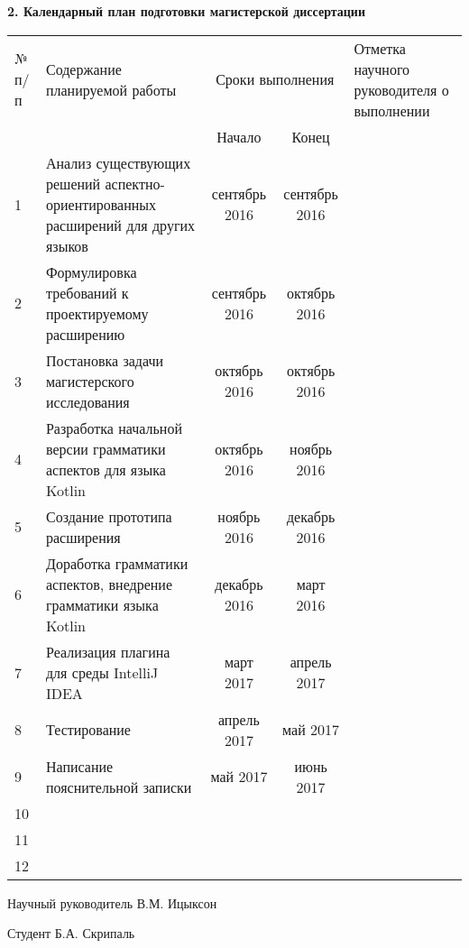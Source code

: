 \begin{center}

\textbf{2. Календарный план подготовки магистерской диссертации}

\vspace{1em}

\begin{tabularx}{\textwidth}{| p{0.5cm} | p{5.5cm} | c | c | p{3.6cm} |}
\hline
№ п/п & Содержание планируемой работы & \multicolumn{2}{|c|}{Сроки выполнения}
& Отметка \mbox{научного} \mbox{руководителя} о выполнении \\ \cline{3-4}
& & Начало & Конец & \\ \hline
1 & Анализ существующих решений аспектно-ориентированных расширений для других 
языков & сентябрь 2016 & 
сентябрь 2016 & \\ \hline
2 & Формулировка требований к проектируемому расширению & сентябрь 2016 & 
октябрь 2016 & \\ \hline
3 & Постановка задачи магистерского исследования & октябрь 2016 & октябрь 2016 
& \\ \hline
4 & Разработка начальной версии грамматики аспектов для языка Kotlin & октябрь 
2016 & ноябрь 2016 & \\ \hline
5 & Создание прототипа расширения & ноябрь 2016 & декабрь 2016 & \\ \hline
6 & Доработка грамматики аспектов, внедрение грамматики языка Kotlin & декабрь 
2016 & март 2016 & \\ \hline
7 & Реализация плагина для среды IntelliJ IDEA & март 2017 & апрель 2017 & \\ 
\hline
8 & Тестирование & апрель 2017 & май 2017 & \\ \hline
9 & Написание пояснительной записки & май 2017 & июнь 2017 & \\ \hline
10 & & & & \\ \hline
11 & & & & \\ \hline
12 & & & & \\ \hline
\end{tabularx}

\end{center}

\vspace{1em}

Научный руководитель \uline{\hfill} В.М. Ицыксон

\vspace{1em}

Студент \uline{\hfill} Б.А. Скрипаль
